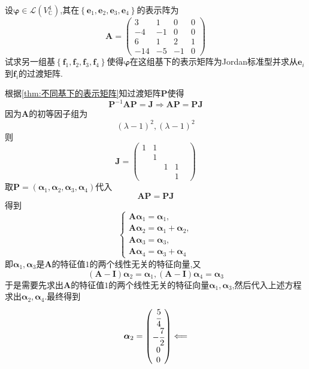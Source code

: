 \begin{brown}
\begin{example}
    设$\bm{\varphi}\in \mathcal{L}\left(V_{\mathbb{C}}^4\right)$,其在$\left\{
        \bm{e}_1,\bm{e}_2,\bm{e}_3,\bm{e}_4
    \right\}$的表示阵为\[\bm{A}=
    \begin{pmatrix}
        3&1&0&0\\
        -4&-1&0&0\\
        6&1&2&1\\
        -14&-5&-1&0
    \end{pmatrix}
    \]试求另一组基$\left\{
        \bm{f}_1,\bm{f}_2,\bm{f}_3,\bm{f}_4
    \right\}$使得$\bm{\varphi}$在这组基下的表示矩阵为\textup{Jordan}标准型并求从$\bm{e}_i$到$\bm{f}_i$的过渡矩阵.
\end{example}
\begin{solution}
    根据\cref{thm:不同基下的表示矩阵}知过渡矩阵$\bm{P}$使得\[
    \bm{P}^{-1}\bm{A}\bm{P}=\bm{J}\Longrightarrow
    \bm{AP}= \bm{PJ}
    \]因为$\bm{A}$的初等因子组为\[
    \left(\lambda-1\right)^2,\left(\lambda-1\right)^2
    \]则\[
    \bm{J}=\begin{pmatrix}
        1&1&&&\\
        &1 &&&\\
        &&1&1&\\
        &&&1
    \end{pmatrix}
    \]取$\bm{P}=\left(\bm{\alpha}_1,\bm{\alpha}_2,\bm{\alpha}_3,\bm{\alpha}_4\right)$代入\[
    \bm{AP}= \bm{PJ}
    \]得到\[
    \begin{cases*}
    \bm{A\alpha}_1=\bm{\alpha}_1,\\
    \bm{A\alpha}_2=\bm{\alpha}_1+\bm{\alpha}_2,\\
    \bm{A\alpha}_3=\bm{\alpha}_3,\\
    \bm{A\alpha}_4=\bm{\alpha}_3+\bm{\alpha}_4
    \end{cases*}
    \]即$\bm{\alpha}_1,\bm{\alpha}_3$是$\bm{A}$的特征值$1$的两个线性无关的特征向量,又\[
    \left(\bm{A}-\bm{I}\right)\bm{\alpha}_2=\bm{\alpha}_1,\left(\bm{A}-\bm{I}\right)\bm{\alpha}_4=\bm{\alpha}_3
    \]于是需要先求出$\bm{A}$的特征值$1$的两个线性无关的特征向量$\bm{\alpha}_1,\bm{\alpha}_3$,然后代入上述方程求出$\bm{\alpha}_2,\bm{\alpha}_4$.最终得到\[\bm{\alpha}_2=\begin{pmatrix}
        \cfrac{5}{4}\\-\cfrac{7}{2}\\0\\0
    \end{pmatrix}\Longleftarrow
\]
\end{solution}
\end{brown}
